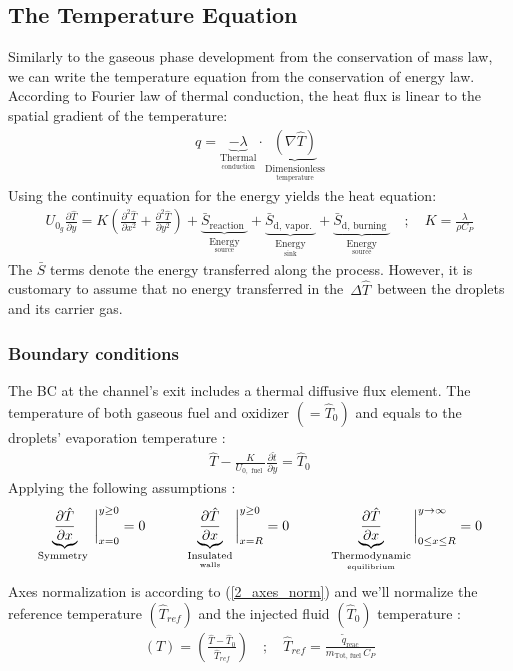 \documentclass[12pt]{article}
\newcommand\tab[1][1cm]{\hspace*{#1}}
\numberwithin{equation}{section}
\begin{document}
\begin{flushleft}
\subsection{The Temperature Equation}

Similarly to the gaseous phase development from the conservation of mass law, we can write
the temperature equation from the conservation of energy law. According to Fourier law of thermal conduction, the heat flux is linear to the spatial gradient of the temperature:
\begin{align}
q=\underbrace{-\lambda}_{   \underset{\text {conduction}}{\text {Thermal}}} \cdot
\underbrace{(\nabla \hat{T})}_{   \underset{\text {temperature}}{\text {Dimensionless}}}
\end{align}
Using the continuity equation for the energy yields the heat equation:
\begin{align}
U_{0_{g}} \frac{\partial \hat{T}}{\partial y}=K\left(\frac{\partial^{2} \hat{T}}{\partial x^{2}}+\frac{\partial^{2} \hat{T}}{\partial y^{2}}\right)+
\underbrace{\bar{S}_{\text {reaction }}}_{ \underset{\text {source}}{\text {Energy}}}+
\underbrace{ \bar{S}_{\text {d, vapor. }} }_{ \underset{\text {sink}}{\text {Energy}}}+
\underbrace{ \bar{S}_{\text {d, burning }} }_{ \underset{\text {source}}{\text {Energy}}} \quad ; \quad K=\frac{\lambda}{\rho C_{P}}
\end{align}
The $\bar{S}$ terms denote the energy transferred along the process. However, it is customary to assume that no energy transferred in the \,$\Delta \hat{T}$\, between the droplets and its carrier gas.

\subsubsection{Boundary conditions}
The BC at the channel's exit includes a thermal diffusive flux element. The temperature of both gaseous fuel and oxidizer $(=\hat{T}_{0} )$ and equals to the droplets' evaporation temperature :
\begin{align}
\hat{T}-\frac{K}{U_{0, \text { fuel }}} \frac{\partial \hat{t}}{\partial y}=\hat{T}_{0}
\end{align}
Applying the following assumptions :
\begin{align}
\underbrace{\frac{\partial \hat{T}}{\partial x}}_{\text {Symmetry }} \bigg|_{x=0} ^{y \geq 0}=0 \tab \underbrace{\frac{\partial \hat{T}}{\partial x}}_{  \underset{\text {walls}}{\text{Insulated}} } \bigg|_{x=R}^{y \geq 0}= 0 \tab \underbrace{\frac{\partial \hat{T}}{\partial x}}_{  \underset{\text {equilibrium}}{\text{Thermodynamic}} }\bigg|_{0 \leq x \leq R}^{y \rightarrow \infty}=0
\end{align}
Axes normalization is according to (\ref{2_axes_norm}) and we'll normalize the reference temperature $\left(\hat{T}_{ref}\right)$ and the injected fluid $\left(\hat{T}_{0}\right)$ temperature :
\begin{align}
(T)=\left(\frac{\hat{T}-\hat{T}_{0}}{\hat{T}_{r e f}}\right) \quad ; \quad \hat{T}_{ref}=\frac{\tilde{q}_{\text{reac}}}{m_{ \text{Tot, fuel}}\, C_{P}}
\end{align}


\end{flushleft}
\end{document}
